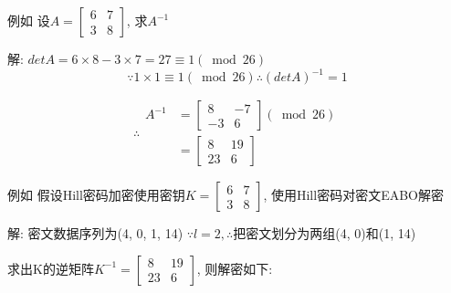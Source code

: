 \documentclass[UTF8]{ctexart}
\begin{document}
\begin{itemize}
\begin{enumerate}
\begin{itemize}
                例如 设$A=\left[ \begin{array}{cc}{6} &{7}\\ {3} &{8} \end{array}\right]$, 求$A^{-1}$

                    解: $detA=6\times 8 - 3\times 7=27\equiv 1(\bmod 26)$
                    $$
                    \because 1\times 1\equiv 1(\bmod 26)
                    \therefore (detA)^{-1}=1
                    $$

                    $$
                    \therefore
                    \begin{aligned}
                        A^{-1}&=\left[ \begin{array}{cc}{8} &{-7}\\ {-3} &{6} \end{array}\right](\bmod 26)\\
                            &=\left[ \begin{array}{cc}{8} &{19}\\ {23} &{6} \end{array}\right]
                    \end{aligned}
                    $$

                例如 假设Hill密码加密使用密钥$K=\left[ \begin{array}{cc}{6} &{7}\\ {3} &{8} \end{array}\right]$, 使用Hill密码对密文EABO解密

                    解: 密文数据序列为(4, 0, 1, 14)
                    $\because l=2, \therefore$把密文划分为两组(4, 0)和(1, 14)

                    求出K的逆矩阵$K^{-1}=\left[ \begin{array}{cc}{8} &{19}\\ {23} &{6}\end{array}\right]$, 则解密如下:


\end{itemize}
\end{enumerate}
\end{itemize}
\end{document}
